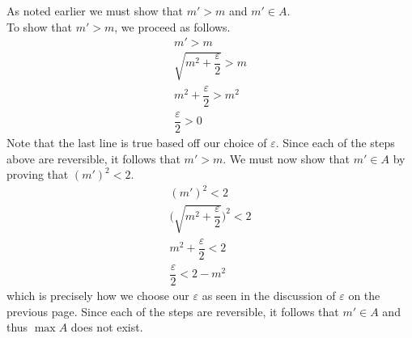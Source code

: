 \documentclass[12pt]{article}
\begin{document}
As noted earlier we must show that $m' > m$ and $m' \in A$.\\
To show that $m' > m$, we proceed as follows.\\
\begin{align*}
m' > m \\
\sqrt{m^2 + \dfrac{\varepsilon}{2}} > m \\
m^2 + \dfrac{\varepsilon}{2} > m^2 \\
\dfrac{\varepsilon}{2} > 0
\end{align*}
Note that the last line is true based off our choice of $\varepsilon$. Since each of the steps above are reversible, it follows that $m' > m$. We must now show that $m' \in A$ by proving that $(m')^2 < 2$. \\
\begin{align*}
(m')^2 < 2 \\
\Bigg( \sqrt{m^2 + \dfrac{\varepsilon}{2}} \Bigg)^2 < 2 \\
m^2 + \dfrac{\varepsilon}{2} < 2 \\
\dfrac{\varepsilon}{2} < 2-m^2
\end{align*}
which is precisely how we choose our $\varepsilon$ as seen in the discussion of $\varepsilon$ on the previous page. Since each of the steps are reversible, it follows that $m' \in A$ and thus $\max{A}$ does not exist. 
\end{document}
